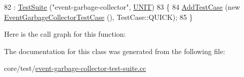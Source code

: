 \begin{DoxyCode}
82     : \hyperlink{classns3_1_1TestSuite_a904b0c40583b744d30908aeb94636d1a}{TestSuite} (\textcolor{stringliteral}{"event-garbage-collector"}, \hyperlink{classns3_1_1TestSuite_a1ebfcab34ec8161e085e8e3a1855eae0a3885375a3787abf60431f8454b3cadbd}{UNIT}) 
83   \{
84     \hyperlink{classns3_1_1TestCase_a3718088e3eefd5d6454569d2e0ddd835}{AddTestCase} (\textcolor{keyword}{new} \hyperlink{classEventGarbageCollectorTestCase}{EventGarbageCollectorTestCase} (), 
      TestCase::QUICK);
85   \}
\end{DoxyCode}


Here is the call graph for this function\+:




The documentation for this class was generated from the following file\+:\begin{DoxyCompactItemize}
\item 
core/test/\hyperlink{event-garbage-collector-test-suite_8cc}{event-\/garbage-\/collector-\/test-\/suite.\+cc}\end{DoxyCompactItemize}
